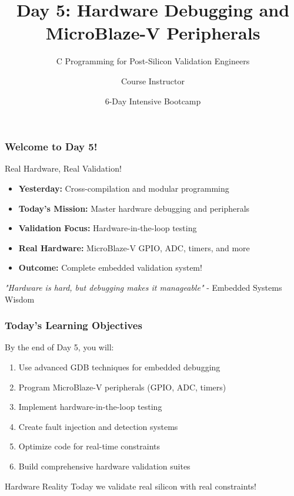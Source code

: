 \documentclass{beamer}
\title{Day 5: Hardware Debugging and MicroBlaze-V Peripherals}
\subtitle{C Programming for Post-Silicon Validation Engineers}
\author{Course Instructor}
\date{6-Day Intensive Bootcamp}
\institute{Post-Silicon Validation Training Program}
\begin{document}
\frame{\titlepage}

\begin{frame}
\frametitle{Welcome to Day 5!}
\begin{center}
\Large Real Hardware, Real Validation!
\end{center}

\begin{itemize}
    \item \textbf{Yesterday:} Cross-compilation and modular programming
    \item \textbf{Today's Mission:} Master hardware debugging and peripherals
    \item \textbf{Validation Focus:} Hardware-in-the-loop testing
    \item \textbf{Real Hardware:} MicroBlaze-V GPIO, ADC, timers, and more
    \item \textbf{Outcome:} Complete embedded validation system!
\end{itemize}

\vspace{0.5cm}
\begin{center}
\textit{"Hardware is hard, but debugging makes it manageable"} - Embedded Systems Wisdom
\end{center}
\end{frame}

\begin{frame}
\frametitle{Today's Learning Objectives}
By the end of Day 5, you will:

\begin{enumerate}
    \item Use advanced GDB techniques for embedded debugging
    \item Program MicroBlaze-V peripherals (GPIO, ADC, timers)
    \item Implement hardware-in-the-loop testing
    \item Create fault injection and detection systems
    \item Optimize code for real-time constraints
    \item Build comprehensive hardware validation suites
\end{enumerate}

\vspace{0.5cm}
\begin{alertblock}{Hardware Reality}
Today we validate real silicon with real constraints!
\end{alertblock}
\end{frame}
\end{document}
